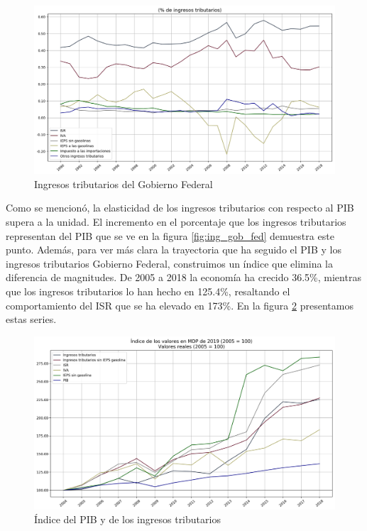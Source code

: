 \documentclass[a4paper, 11pt]{article}
\begin{document}
\begin{figure}[hbt!]
    \centering
     \caption{Ingresos tributarios del Gobierno Federal}
     \label{fig:impuestos_perc_trib}
     \includegraphics[scale = 0.4]{figures/impuestos_perc_trib}
\end{figure}

Como se mencionó, la elasticidad de los ingresos tributarios con respecto al PIB supera a la unidad. El incremento en el porcentaje que los ingresos tributarios representan del PIB que se ve en la figura \ref{fig:ing_gob_fed} demuestra este punto. Además, para ver más clara la trayectoria que ha seguido el PIB y los ingresos tributarios Gobierno Federal, construimos un índice que elimina la diferencia de magnitudes. De 2005 a 2018 la economía ha crecido 36.5\%, mientras que 
los ingresos tributarios lo han hecho en 125.4\%, resaltando el comportamiento del ISR que se ha elevado en 173\%.  En la figura \ref{fig:indice_pib_impuestos_netos} presentamos estas series.
\begin{figure}[hbt!]
    \centering
     \caption{Índice del PIB y de los ingresos tributarios }
     \label{fig:indice_pib_impuestos_netos}
     \includegraphics[scale = 0.4]{figures/indice_pib_impuestos_netos}
\end{figure}
\end{document}
